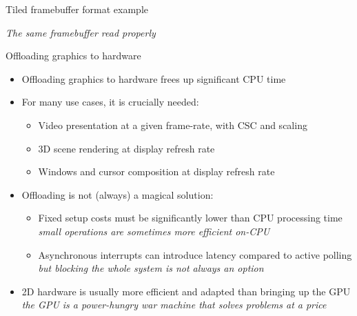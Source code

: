 \begin{frame}{Tiled framebuffer format example}
\begin{minipage}[b]{0.45\textwidth}
    \textit{\small The same framebuffer read properly}
  \end{minipage}
\end{frame}

\begin{frame}{Offloading graphics to hardware}
  \begin{itemize}
  \item Offloading graphics to hardware frees up significant CPU time
  \item For many use cases, it is crucially needed:
    \begin{itemize}
    \item Video presentation at a given frame-rate, with CSC and scaling
    \item 3D scene rendering at display refresh rate
    \item Windows and cursor composition at display refresh rate
    \end{itemize}
  \item Offloading is not (always) a magical solution:
    \begin{itemize}
    \item Fixed setup costs must be significantly lower than CPU processing time\\
      \textit{small operations are sometimes more efficient on-CPU}
    \item Asynchronous interrupts can introduce latency compared to active polling\\
      \textit{but blocking the whole system is not always an option}
    \end{itemize}
  \item 2D hardware is usually more efficient and adapted than bringing up the GPU\\
    \textit{the GPU is a power-hungry war machine that solves problems at a price}
  \end{itemize}
\end{frame}

